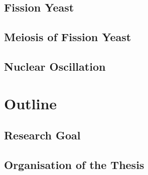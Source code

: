 \subsection{Fission Yeast}
\label{sub:fission_yeast}

\subsection{Meiosis of Fission Yeast}
\label{sub:meiosis_of_fission_yeast}

\subsection{Nuclear Oscillation}
\label{sub:nuclear_oscillation}





\section{Outline}  %
\label{sec:outline}

\subsection{Research Goal}
\label{sub:research_goal}

\subsection{Organisation of the Thesis}
\label{sub:organisation_of_the_thesis}












